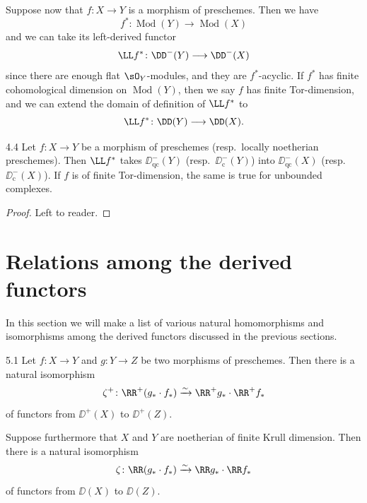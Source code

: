 Suppose now that $f\colon X\to Y$ is a morphism of preschemes. Then we have
\[
f^*\colon \operatorname{Mod}(Y) \longrightarrow \operatorname{Mod}(X)
\]
and we can take its left-derived functor
\[
\LL f^*\colon \DD^-(Y) \longrightarrow \DD^-(X)
\]
since there are enough flat $\sO_Y$-modules, and they are $f^*$-acyclic. If $f^*$ has finite cohomological dimension on $\operatorname{Mod}(Y)$, then we say $f$ has finite Tor-dimension, and we can extend the domain of definition of $\LL f^*$ to
\[
\LL f^*\colon \DD(Y) \longrightarrow \DD(X).
\]

\begin{bookproposition}{4.4}\label{prop:2.4.5}
Let $f\colon X\to Y$ be a morphism of preschemes (resp.\ locally noetherian preschemes). Then $\LL f^*$ takes $\DD_{\mathrm{qc}}^-(Y)$ (resp.\ $\DD_{\mathrm{c}}^-(Y)$) into $\DD_{\mathrm{qc}}^-(X)$ (resp.\ $\DD_{\mathrm{c}}^-(X)$). If $f$ is of finite Tor-dimension, the same is true for unbounded complexes.
\end{bookproposition}

\begin{proof}
Left to reader.
\end{proof}
\section{Relations among the derived functors}\label{sec:2.5}

In this section we will make a list of various natural homomorphisms and isomorphisms among the derived functors discussed in the previous sections.

\begin{bookproposition}{5.1}\label{prop:2.5.1}
Let $f\colon X\to Y$ and $g\colon Y\to Z$ be two morphisms of preschemes. Then there is a natural isomorphism
\[
\zeta^+\colon \RR^+(g_*\cdot f_*) \xrightarrow{\sim} \RR^+g_*\cdot \RR^+f_*
\]
of functors from $\DD^+(X)$ to $\DD^+(Z)$.

Suppose furthermore that $X$ and $Y$ are noetherian of finite Krull dimension. Then there is a natural isomorphism
\[
\zeta\colon \RR(g_*\cdot f_*) \xrightarrow{\sim} \RR g_*\cdot \RR f_*
\]
of functors from $\DD(X)$ to $\DD(Z)$.
\end{bookproposition}

